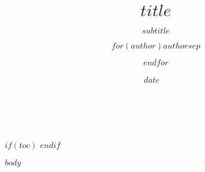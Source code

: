 \documentclass[$if(fontsize)$$fontsize$$else$11pt$endif$,$if(lang)$$babel-lang$,$endif$$if(papersize)$$papersize$$else$a4paper$endif$,$for(classoption)$$classoption$$sep$,$endfor$]{$documentclass$}
\title{$title$}
\subtitle{$subtitle$}
\institute{$for(institute)$$institute$$sep$ \and $endfor$}
\author{$for(author)$$author$$sep$ \and $endfor$}
\date{$date$}
\date{\sf\Date~\Month~\Year}
\makeatletter
\renewcommand*{\maketitle}{%
    \begin{titlepage}
        \begin{center}
        \sffamily\Huge\bfseries\@title \\
        \vspace{2 cm}
        \sffamily\Large\mdseries\@author
        \vspace{1.5cm}
        \end{center}
        \sffamily\Large
        \@date
    \end{titlepage}
}
\makeatother
\begin{document}
\begin{titlepage}
\maketitle
\end{titlepage}



$if(toc)$
{
\newpage
\setcounter{tocdepth}{$toc-depth$}
\tableofcontents
\newpage
}
$endif$

$body$
\end{document}

